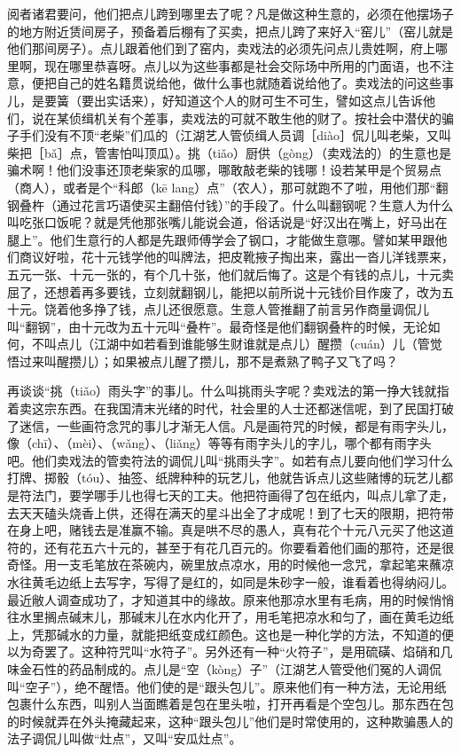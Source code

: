 \documentclass[12pt,UTF8]{ctexbook}
\begin{document}
阅者诸君要问，他们把点儿跨到哪里去了呢？凡是做这种生意的，必须在他摆场子的地方附近赁间房子，预备着后棚有了买卖，把点儿跨了来好入“窑儿”（窑儿就是他们那间房子）。点儿跟着他们到了窑内，卖戏法的必须先问点儿贵姓啊，府上哪里啊，现在哪里恭喜呀。点儿以为这些事都是社会交际场中所用的门面语，也不注意，便把自己的姓名籍贯说给他，做什么事也就随着说给他了。卖戏法的问这些事儿，是要簧（要出实话来），好知道这个人的财可生不可生，譬如这点儿告诉他们，说在某侦缉机关有个差事，卖戏法的可就不敢生他的财了。按社会中潜伏的骗子手们没有不顶“老柴”们瓜的（江湖艺人管侦缉人员调［diào］侃儿叫老柴，又叫柴把［bǎ］点，管害怕叫顶瓜）。挑（tiǎo）厨供（gòng）（卖戏法的）的生意也是骗术啊！他们没事还顶老柴家的瓜哪，哪敢敲老柴的钱哪！设若某甲是个贸易点（商人），或者是个“科郎（kē lang）点”（农人），那可就跑不了啦，用他们那“翻钢叠杵（通过花言巧语使买主翻倍付钱）”的手段了。什么叫翻钢呢？生意人为什么叫吃张口饭呢？就是凭他那张嘴儿能说会道，俗话说是“好汉出在嘴上，好马出在腿上”。他们生意行的人都是先跟师傅学会了钢口，才能做生意哪。譬如某甲跟他们商议好啦，花十元钱学他的叫牌法，把皮靴掖子掏出来，露出一沓儿洋钱票来，五元一张、十元一张的，有个几十张，他们就后悔了。这是个有钱的点儿，十元卖屈了，还想着再多要钱，立刻就翻钢儿，能把以前所说十元钱价目作废了，改为五十元。饶着他多挣了钱，点儿还很愿意。生意人管推翻了前言另作商量调侃儿叫“翻钢”，由十元改为五十元叫“叠杵”。最奇怪是他们翻钢叠杵的时候，无论如何，不叫点儿（江湖中如若看到谁能够生财谁就是点儿）醒攒（cuán）儿（管觉悟过来叫醒攒儿）；如果被点儿醒了攒儿，那不是煮熟了鸭子又飞了吗？

再谈谈“挑（tiǎo）雨头字”的事儿。什么叫挑雨头字呢？卖戏法的第一挣大钱就指着卖这宗东西。在我国清末光绪的时代，社会里的人士还都迷信呢，到了民国打破了迷信，一些画符念咒的事儿才渐无人信。凡是画符咒的时候，都是有雨字头儿，像（chī）、（mèi）、（wǎng）、（liǎng）等等有雨字头儿的字儿，哪个都有雨字头吧。他们卖戏法的管卖符法的调侃儿叫“挑雨头字”。如若有点儿要向他们学习什么打牌、掷骰（tóu）、抽签、纸牌种种的玩艺儿，他就告诉点儿这些赌博的玩艺儿都是符法门，要学哪手儿也得七天的工夫。他把符画得了包在纸内，叫点儿拿了走，去天天磕头烧香上供，还得在满天的星斗出全了才成呢！到了七天的限期，把符带在身上吧，赌钱去是准赢不输。真是哄不尽的愚人，真有花个十元八元买了他这道符的，还有花五六十元的，甚至于有花几百元的。你要看着他们画的那符，还是很奇怪。用一支毛笔放在茶碗内，碗里放点凉水，用的时候他一念咒，拿起笔来蘸凉水往黄毛边纸上去写字，写得了是红的，如同是朱砂字一般，谁看着也得纳闷儿。最近敝人调查成功了，才知道其中的缘故。原来他那凉水里有毛病，用的时候悄悄往水里搁点碱末儿，那碱末儿在水内化开了，用毛笔把凉水和匀了，画在黄毛边纸上，凭那碱水的力量，就能把纸变成红颜色。这也是一种化学的方法，不知道的便以为奇罢了。这种符咒叫“水符子”。另外还有一种“火符子”，是用硫磺、焰硝和几味金石性的药品制成的。点儿是“空（kòng）子”（江湖艺人管受他们冤的人调侃叫“空子”），绝不醒悟。他们使的是“跟头包儿”。原来他们有一种方法，无论用纸包裹什么东西，叫别人当面瞧着是包在里头啦，打开再看是个空包儿。那东西在包的时候就弄在外头掩藏起来，这种“跟头包儿”他们是时常使用的，这种欺骗愚人的法子调侃儿叫做“灶点”，又叫“安瓜灶点”。
\end{document}
